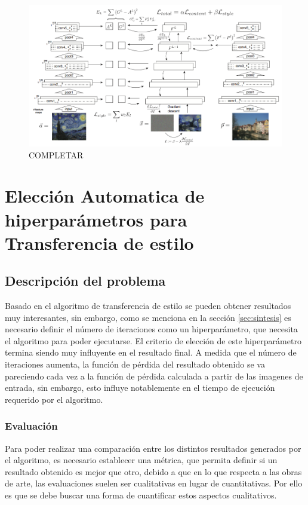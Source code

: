 \documentclass[a4paper,11pt,spanish]{book}
\begin{document}
      \begin{figure}[h]
	\includegraphics[width=\linewidth]{./img/gatys_method.png}
	\caption{COMPLETAR}
	\label{fig:gatys_2}
      \end{figure}


\chapter{Elección Automatica de hiperparámetros para Transferencia de estilo}
  \section{Descripción del problema}
    Basado en el algoritmo de transferencia de estilo se pueden obtener resultados muy interesantes, sin embargo, como se menciona en la sección \ref{sec:sintesis}
    es necesario definir el número de iteraciones como un hiperparámetro, que necesita el algoritmo para poder ejecutarse.
    El criterio de elección de este hiperparámetro termina siendo muy influyente en el resultado final. A medida que el número de iteraciones
    aumenta, la función de pérdida del resultado obtenido se va pareciendo cada vez a la función de pérdida calculada a partir de las imagenes de entrada, sin embargo,
    esto influye notablemente en el tiempo de ejecución requerido por el algoritmo.

    \subsection{Evaluación \label{sec:evaluacion}}
      Para poder realizar una comparación entre los distintos resultados generados por el algoritmo, es necesario establecer una métrica, que permita definir si un resultado
      obtenido es mejor que otro, debido a que en lo que respecta a las obras de arte, las evaluaciones suelen ser cualitativas en lugar de cuantitativas.
      Por ello es que se debe buscar una forma de cuantificar estos aspectos cualitativos.
\end{document}
